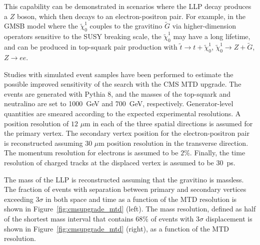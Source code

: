 This capability can be demonstrated in scenarios where the LLP decay produces a $Z$ boson, which then decays to an electron-positron pair. For example, in the GMSB model where the $\tilde{\chi}_0^1$ couples to the gravitino $\tilde{G}$ via higher-dimension operators sensitive to the SUSY breaking scale, the $\tilde{\chi}_0^1$ may have a long lifetime, and can be produced in top-squark pair production with $\tilde{t}\to t+\tilde{\chi}_0^1$, $\tilde{\chi}_0^1 \to Z+\tilde{G}$, $Z\to ee$.

Studies with simulated event samples have been performed to estimate the possible improved sensitivity of the search with the CMS MTD upgrade. The events are generated with Pythia 8, and the masses of the top-squark and neutralino are set to 1000~GeV and 700~GeV, respectively. Generator-level quantities are smeared according to the expected experimental resolutions. A position resolution of $12\,\,\mu\mathrm{m}$ in each of the three spatial directions is assumed for the primary vertex. The secondary vertex position for the electron-positron pair is reconstructed assuming $30\,\,\mu\mathrm{m}$ position resolution in the transverse direction. The momentum resolution for electrons is assumed to be $2\%$. Finally, the time resolution of charged tracks at the displaced vertex is assumed to be 30~ps.

The mass of the LLP is reconstructed assuming that the gravitino is massless. The fraction of events with separation between primary and secondary vertices exceeding 3$\sigma$ in both space and time as a function of the MTD resolution is shown in Figure~\ref{fig:cmsupgrade_mtd} (left). The mass resolution, defined as half of the shortest mass interval that contains $68\%$ of events with 3$\sigma$ displacement is shown in Figure~\ref{fig:cmsupgrade_mtd} (right), as a function of the MTD resolution.


